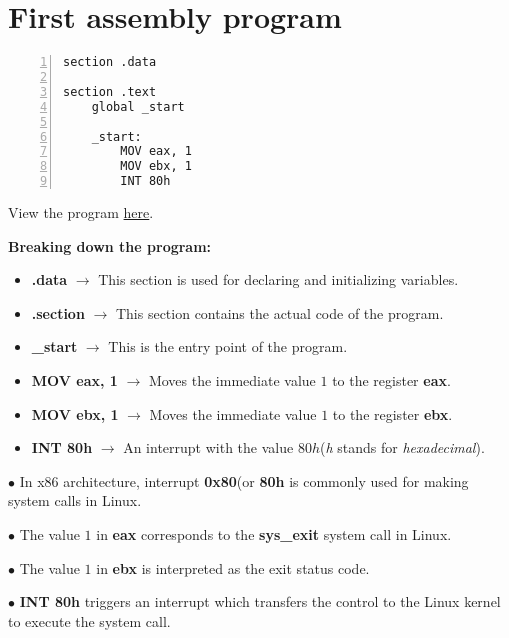 \documentclass{article}
\makeatletter
\renewcommand\paragraph{\@startsection{paragraph}{4}{\z@}{-3.25ex \@plus -1ex \@minus -.2ex}{1.5ex \@plus .2ex}{\normalfont\normalsize\bfseries}}
\makeatother
\begin{document}
\section{First assembly program}\label{sec:firstAsm}

\paragraph{}

\begin{Verbatim}[numbers=left, frame=single]
section .data

section .text
	global _start
	
	_start:
		MOV eax, 1
		MOV ebx, 1
		INT 80h
\end{Verbatim}

View the program \href{https://github.com/C0DER11101/NASM/blob/nAsM/programs/asm1.asm}{here}.

\vspace{10pt}
\textbf{Breaking down the program:}

\begin{itemize}
\item \textbf{.data} $\rightarrow$ This section is used for declaring and initializing variables.
\item \textbf{.section} $\rightarrow$ This section contains the actual code of the program.
\item \textbf{\_start} $\rightarrow$ This is the entry point of the program.
\item \textbf{MOV eax, 1} $\rightarrow$ Moves the immediate value $1$ to the register \textbf{eax}.
\item \textbf{MOV ebx, 1} $\rightarrow$ Moves the immediate value $1$ to the register \textbf{ebx}.
\item \textbf{INT 80h} $\rightarrow$ An interrupt with the value $80h$(\textit{h} stands for \textit{hexadecimal}).
\end{itemize}

$\bullet$ In x86 architecture, interrupt \textbf{0x80}(or \textbf{80h} is commonly used for making system calls in Linux.

$\bullet$ The value $1$ in \textbf{eax} corresponds to the \textbf{sys\_exit} system call in Linux.

$\bullet$ The value $1$ in \textbf{ebx} is interpreted as the exit status code.

$\bullet$ \textbf{INT 80h} triggers an interrupt which transfers the control to the Linux kernel to execute the system call.
\end{document}
